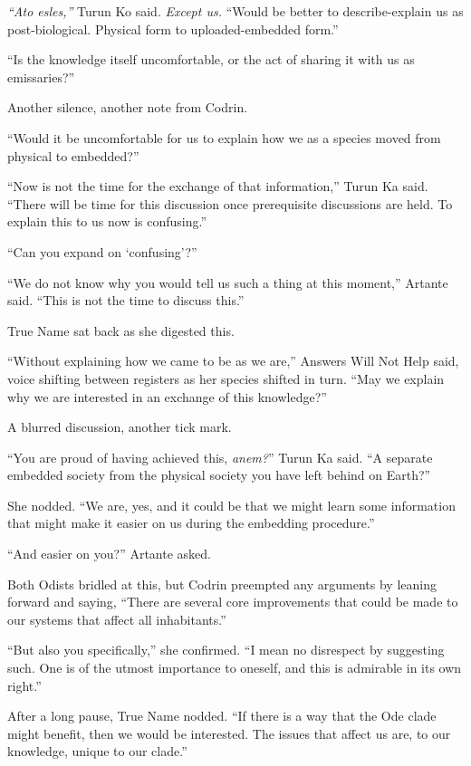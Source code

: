 \emph{``Ato esles,''} Turun Ko said. \emph{Except us.} ``Would be better to describe-explain us as post-biological. Physical form to uploaded-embedded form.''

``Is the knowledge itself uncomfortable, or the act of sharing it with us as emissaries?''

Another silence, another note from Codrin.

``Would it be uncomfortable for us to explain how we as a species moved from physical to embedded?''

``Now is not the time for the exchange of that information,'' Turun Ka said. ``There will be time for this discussion once prerequisite discussions are held. To explain this to us now is confusing.''

``Can you expand on `confusing'?''

``We do not know why you would tell us such a thing at this moment,'' Artante said. ``This is not the time to discuss this.''

True Name sat back as she digested this.

``Without explaining how we came to be as we are,'' Answers Will Not Help said, voice shifting between registers as her species shifted in turn. ``May we explain why we are interested in an exchange of this knowledge?''

A blurred discussion, another tick mark.

``You are proud of having achieved this, \emph{anem?}'' Turun Ka said. ``A separate embedded society from the physical society you have left behind on Earth?''

She nodded. ``We are, yes, and it could be that we might learn some information that might make it easier on us during the embedding procedure.''

``And easier on you?'' Artante asked.

Both Odists bridled at this, but Codrin preempted any arguments by leaning forward and saying, ``There are several core improvements that could be made to our systems that affect all inhabitants.''

``But also you specifically,'' she confirmed. ``I mean no disrespect by suggesting such. One is of the utmost importance to oneself, and this is admirable in its own right.''

After a long pause, True Name nodded. ``If there is a way that the Ode clade might benefit, then we would be interested. The issues that affect us are, to our knowledge, unique to our clade.''


